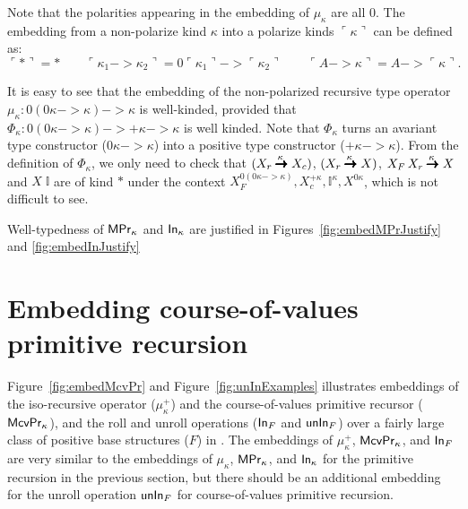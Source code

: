 Note that the polarities appearing in the embedding of $\mu_\kappa$ are all
$0$. The embedding from a non-polarize kind $\kappa$ into
a polarize kinds $\ulcorner\kappa\urcorner$ can be defined as:
\[ \ulcorner * \urcorner = * \qquad
\ulcorner \kappa_1 -> \kappa_2 \urcorner =
0\ulcorner\kappa_1\urcorner -> \ulcorner\kappa_2\urcorner \qquad
\ulcorner A -> \kappa \urcorner = A -> \ulcorner \kappa \urcorner.
\]

It is easy to see that the embedding of the non-polarized recursive
type operator $\mu_\kappa : 0(0\kappa -> \kappa) -> \kappa$
is well-kinded, provided that
$\Phi_\kappa : 0(0\kappa -> \kappa) -> +\kappa -> \kappa$
is well kinded. Note that $\Phi_\kappa$ turns an avariant type constructor
($0\kappa -> \kappa$) into a positive type constructor
($+\kappa -> \kappa$). From the definition of $\Phi_\kappa$, we only need 
to check that $(X_r \stackrel{\kappa\;}{\pmb{\pmb{->}}} X_c)$, $(X_r \stackrel{\kappa\;}{\pmb{\pmb{->}}} X)$,
$X_F\,X_r \stackrel{\kappa\;}{\pmb{\pmb{->}}} X$ and $X\;\mathbb{I}$ are of kind $*$
under the context $ X_{\!F}^{0(0\kappa -> \kappa)},
		X_c^{+\kappa}, \mathbb{I}^\kappa, X^{0\kappa}$,
which is not difficult to see.

Well-typedness of $\mathsf{MPr}_\kappa$ and $\mathsf{In}_\kappa$ are justified in
Figures~\ref{fig:embedMPrJustify} and \ref{fig:embedInJustify}

\section{Embedding course-of-values primitive recursion}
\label{sec:fixi:cv}
Figure~\ref{fig:embedMcvPr} and Figure~\ref{fig:unInExamples}
illustrates embeddings of the iso-recursive operator ($\mu^{+}_\kappa$) and
the course-of-values primitive recursor ($\mathsf{McvPr}_\kappa$), and
the roll and unroll operations ($\mathsf{In}_F$ and $\mathsf{unIn}_F$) over
a fairly large class of positive base structures ($F$) in \Fixi.
The embeddings of $\mu^{+}_\kappa$, $\mathsf{McvPr}_\kappa$, and $\mathsf{In}_F$
are very similar to the embeddings of $\mu_\kappa$, $\mathsf{MPr}_\kappa$,
and $\mathsf{In}_\kappa$ for the primitive recursion in the previous section,
but there should be an additional embedding for the unroll operation $\mathsf{unIn}_F$
for course-of-values primitive recursion.

